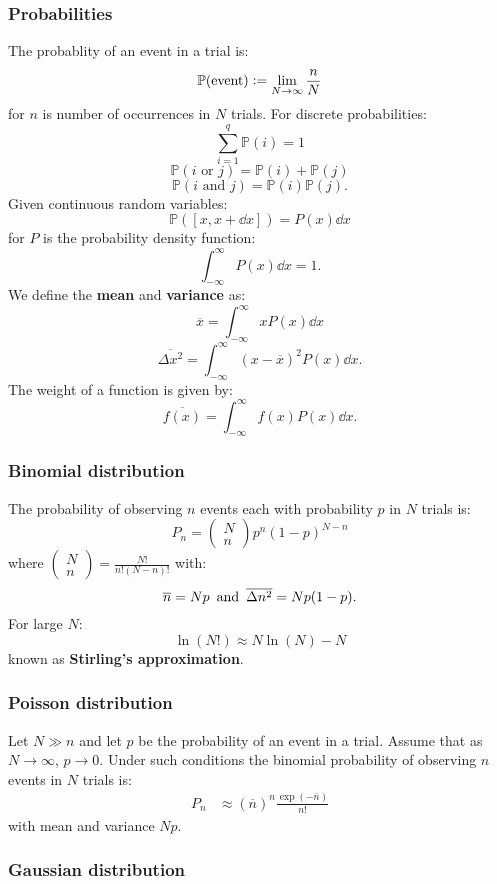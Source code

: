 \documentclass{article}
\newcommand{\deq}{\vcentcolon=}
\newcommand{\pr}{\mathbb{P}}
\begin{document}
\begin{multicols*}{3}
\noindent

\subsubsection*{Probabilities}
The probablity of an event in a trial is:
$$\pr(\text{event})\deq\lim_{N\rightarrow\infty}\frac{n}{N}$$
for $n$ is number of occurrences in $N$ trials.
For discrete probabilities:
$$\sum_{i=1}^{q}\pr(i)=1$$
$$\pr(\text{$i$ or $j$})=\pr(i)+\pr(j)$$
$$\pr(\text{$i$ and $j$})=\pr(i)\pr(j).$$
Given continuous random variables:
$$\pr([x,x+\dd x])=P(x)\dd x$$
for $P$ is the probability density function:
$$\int_{-\infty}^{\infty}P(x)\dd x=1.$$
We define the \textbf{mean} and \textbf{variance} as:
$$\overline{x}=\int_{-\infty}^{\infty}xP(x)\dd x$$
$$\overline{\Delta x^2}=\int_{-\infty}^{\infty}
(x-\overline{x})^2P(x)\dd x.$$
The weight of a function is given by:
$$\overline{f(x)}=\int_{-\infty}^{\infty}f(x)P(x)\dd x.$$

\subsubsection*{Binomial distribution}
The probability of observing $n$ events 
each with probability $p$ in $N$ trials is:
$$P_n=\begin{pmatrix}
N \\ n\end{pmatrix}p^n(1-p)^{N-n}$$
where
$\displaystyle\begin{pmatrix}N \\ n\end{pmatrix}
=\frac{N!}{n!(N-n)!}$ with:
$$\overline{n}=Np
\hspace{0.07in}\text{and}\hspace{0.07in}
\overline{\Delta n^2}=Np(1-p).$$
For large $N$:
$$\ln(N!)\approx N\ln(N)-N$$
known as \textbf{Stirling's approximation}.

\subsubsection*{Poisson distribution}
Let $N\gg n$ and let $p$ be the probability of 
an event in a trial. Assume that as $N\rightarrow\infty$,
$p\rightarrow0$. Under such conditions
the binomial probability of observing $n$ events 
in $N$ trials is:
\begin{align*}
    P_n
    &\approx(\overline{n})^n\frac{\exp(-\overline{n})}{n!}
\end{align*}
with mean and variance $Np$.

\subsubsection*{Gaussian distribution}


\end{multicols*}
\end{document}
